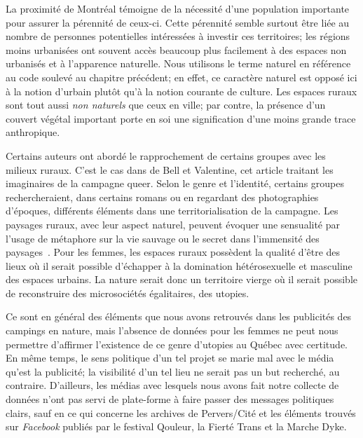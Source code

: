 La proximité de Montréal témoigne de la nécessité d'une population importante pour assurer la pérennité de ceux-ci.
Cette pérennité semble surtout être liée au nombre de personnes potentielles intéressées à investir ces territoires; les régions moins urbanisées ont souvent accès beaucoup plus facilement à des espaces non urbanisés et à l'apparence naturelle.
Nous utilisons le terme naturel en référence au code soulevé au chapitre précédent; en effet, ce caractère naturel est opposé ici à la notion d'urbain plutôt qu'à la notion courante de culture.
Les espaces ruraux sont tout aussi \emph{non naturels} que ceux en ville; par contre, la présence d'un couvert végétal important porte en soi une signification d'une moins grande trace anthropique.

Certains auteurs ont abordé le rapprochement de certains groupes \lgbt{} avec les milieux ruraux.
C'est le cas dans  de Bell et Valentine, cet article traitant les imaginaires de la campagne queer.
Selon le genre et l'identité, certains groupes rechercheraient, dans certains romans ou en regardant des photographies d'époques, différents éléments dans une territorialisation de la campagne.
Les paysages ruraux, avec leur aspect naturel, peuvent évoquer une sensualité par l'usage de métaphore sur la vie sauvage ou le secret dans l'immensité des paysages~\citep[114]{Bell1995a}.
Pour les femmes, les espaces ruraux possèdent la qualité d'être des lieux où il serait possible d'échapper à la domination hétérosexuelle et masculine des espaces urbains.
La nature serait donc un territoire vierge où il serait possible de reconstruire des microsociétés égalitaires, des utopies.

Ce sont en général des éléments que nous avons retrouvés dans les publicités des campings en nature, mais l'absence de données pour les femmes ne peut nous permettre d'affirmer l'existence de ce genre d'utopies au Québec avec certitude.
En même temps, le sens politique d'un tel projet se marie mal avec le média qu'est la publicité; la visibilité d'un tel lieu ne serait pas un but recherché, au contraire.
D'ailleurs, les médias \lgbt{} avec lesquels nous avons fait notre collecte de données n'ont pas servi de plate-forme à faire passer des messages politiques clairs, sauf en ce qui concerne les archives de Pervers/Cité et les éléments trouvés sur \emph{Facebook} publiés par le festival Qouleur, la Fierté Trans et la Marche Dyke.

